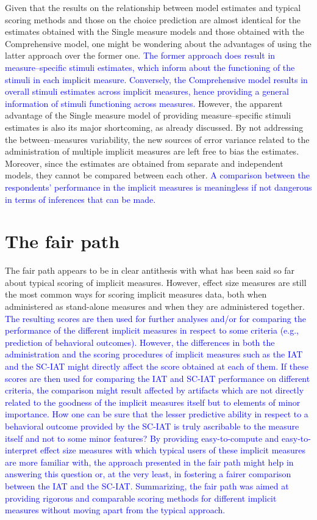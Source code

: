 \documentclass[12pt]{book}
\begin{document}
Given that the results on the relationship between model estimates and typical scoring methods and those on the choice prediction are almost identical for the estimates obtained with the Single measure models and those obtained with the Comprehensive model, one might be wondering about the advantages of using the latter approach over the former one. 
\textcolor{blue}{The former approach does result in measure--specific stimuli estimates, which inform about the functioning of the stimuli in each implicit measure. Conversely, the Comprehensive model results in overall stimuli estimates across implicit measures, hence providing a general information of stimuli functioning across measures.} 
However, the apparent advantage of the Single measure model of providing measure--specific stimuli estimates is also its major shortcoming, as already discussed. By not addressing the between--measures variability, the new sources of error variance related to the administration of multiple implicit measures are left free to bias the estimates. Moreover, since the estimates are obtained from separate and independent models, they cannot be compared between  each other. 
\textcolor{blue}{A comparison between the respondents' performance in the implicit measures is meaningless if not dangerous in terms of inferences that can be made. 
}

\section*{The fair path}

The fair path appears to be in clear antithesis with what has been said so far about typical scoring of implicit measures.
However, effect size measures are still the most common ways for scoring implicit measures data, both when administered as stand-alone measures and when they are administered together. 
\textcolor{blue}{The resulting scores are then used for further analyses and/or for comparing the performance of the different implicit measures in respect to some criteria (e.g., prediction of behavioral outcomes).
However, the differences in both the administration and the scoring procedures of implicit measures such as the IAT and the SC-IAT might directly affect the score obtained at each of them. 
If these scores are then used for comparing the IAT and SC-IAT performance on different criteria, the comparison might result affected by artifacts which are not directly related to the goodness of the implicit measures itself but to elements of minor importance. 
How one can be sure that the lesser predictive ability  in respect to a behavioral outcome provided by the SC-IAT is truly ascribable to the measure itself and not to some minor features? 
By providing easy-to-compute and easy-to-interpret effect size measures with which typical users of these implicit measures are more familiar with, the approach presented in the fair path might help in answering this question or, at the very least, in fostering a fairer comparison between the IAT and the SC-IAT. Summarizing, the fair path was aimed at providing rigorous and comparable scoring methods for different implicit measures without moving apart from the typical approach. }
\end{document}
